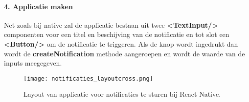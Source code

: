 \paragraph{4. Applicatie maken}
Net zoals bij native zal de applicatie bestaan 
uit twee \textbf{<TextInput/>} componenten voor een titel en beschijving van de notificatie en tot slot een 
\textbf{<Button/>} om de notificatie te triggeren. Als de knop wordt ingedrukt dan wordt de 
\textbf{createNotification} methode aangeroepen en wordt de waarde van de inputs meegegeven.
\begin{figure}[H]
  \centering
  \texttt{[image: notificaties\_layoutcross.png]}
  \caption{Layout van applicatie voor notificaties te sturen bij React Native.}
\end{figure}